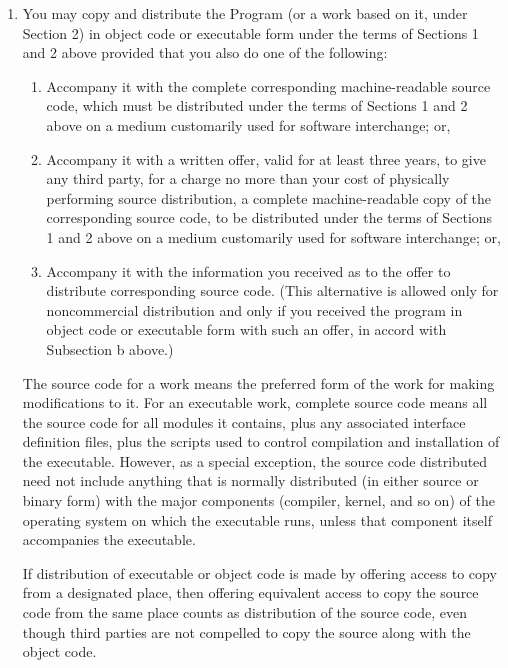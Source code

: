 {\begin{multicols}{2}
\begin{enumerate}
\item
You may copy and distribute the Program (or a work based on it,
under Section 2) in object code or executable form under the terms of
Sections 1 and 2 above provided that you also do one of the following:

\begin{enumerate}

\item
Accompany it with the complete corresponding machine-readable
source code, which must be distributed under the terms of Sections
1 and 2 above on a medium customarily used for software interchange; or,

\item
Accompany it with a written offer, valid for at least three
years, to give any third party, for a charge no more than your
cost of physically performing source distribution, a complete
machine-readable copy of the corresponding source code, to be
distributed under the terms of Sections 1 and 2 above on a medium
customarily used for software interchange; or,

\item
Accompany it with the information you received as to the offer
to distribute corresponding source code.  (This alternative is
allowed only for noncommercial distribution and only if you
received the program in object code or executable form with such
an offer, in accord with Subsection b above.)

\end{enumerate}

The source code for a work means the preferred form of the work for
making modifications to it.  For an executable work, complete source
code means all the source code for all modules it contains, plus any
associated interface definition files, plus the scripts used to
control compilation and installation of the executable.  However, as a
special exception, the source code distributed need not include
anything that is normally distributed (in either source or binary
form) with the major components (compiler, kernel, and so on) of the
operating system on which the executable runs, unless that component
itself accompanies the executable.

If distribution of executable or object code is made by offering
access to copy from a designated place, then offering equivalent
access to copy the source code from the same place counts as
distribution of the source code, even though third parties are not
compelled to copy the source along with the object code.


\end{enumerate}
\end{multicols}}
